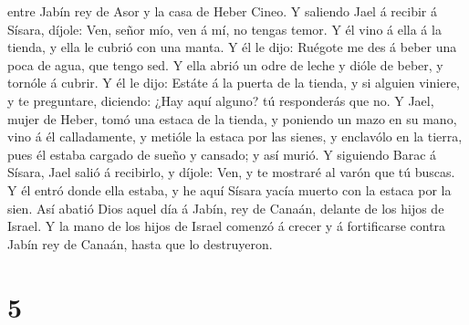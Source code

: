 entre Jabín rey de Asor y la casa de Heber Cineo.  Y
saliendo Jael á recibir á Sísara, díjole: Ven, señor mío, ven á mí, no
tengas temor. Y él vino á ella á la tienda, y ella le cubrió con una
manta.  Y él le dijo: Ruégote me des á beber una poca de
agua, que tengo sed. Y ella abrió un odre de leche y dióle de beber, y
tornóle á cubrir.  Y él le dijo: Estáte á la puerta de la
tienda, y si alguien viniere, y te preguntare, diciendo: ¿Hay aquí
alguno? tú responderás que no.  Y Jael, mujer de Heber,
tomó una estaca de la tienda, y poniendo un mazo en su mano, vino á él
calladamente, y metióle la estaca por las sienes, y enclavólo en la
tierra, pues él estaba cargado de sueño y cansado; y así murió.
 Y siguiendo Barac á Sísara, Jael salió á recibirlo, y
díjole: Ven, y te mostraré al varón que tú buscas. Y él entró donde ella
estaba, y he aquí Sísara yacía muerto con la estaca por la sien.
 Así abatió Dios aquel día á Jabín, rey de Canaán, delante
de los hijos de Israel.  Y la mano de los hijos de Israel
comenzó á crecer y á fortificarse contra Jabín rey de Canaán, hasta que
lo destruyeron.

\hypertarget{section-4}{%
\section{5}\label{section-4}}

